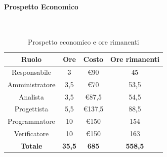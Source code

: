 \documentclass{article}
\begin{document}
                \paragraph{Prospetto Economico}\mbox{}\\
                \begin{table}[H]
                    \centering
                    \begin{tabular}{|c|c|c|c|}
                    \hline
                    \textbf{Ruolo}  & \textbf{Ore}  & \textbf{Costo} & \textbf{Ore rimanenti} \\ \hline
                    Responsabile    & 3             & €90            & 45                     \\ \hline
                    Amministratore  & 3,5           & €70            & 53,5                   \\ \hline
                    Analista        & 3,5           & €87,5          & 54,5                   \\ \hline
                    Progettista     & 5,5           & €137,5         & 88,5                   \\ \hline
                    Programmatore   & 10            & €150           & 154                    \\ \hline
                    Verificatore    & 10            & €150           & 163                    \\ \hline
                    \textbf{Totale} & \textbf{35,5} & \textbf{685}   & \textbf{558,5}         \\ \hline
                    \end{tabular}
                    \caption{Prospetto economico e ore rimanenti}
                \end{table}
\end{document}

